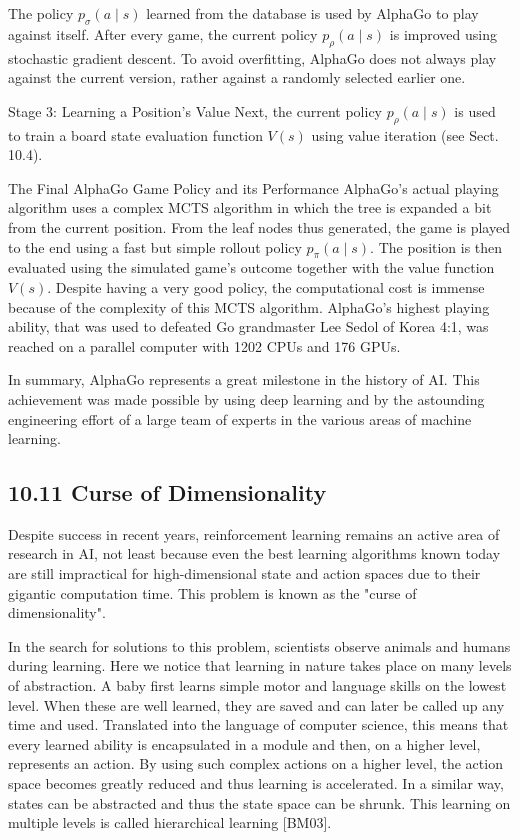 \documentclass[10pt]{article}
\begin{document}
The policy $p_{\sigma}(a \mid s)$ learned from the database is used by AlphaGo to play against itself. After every game, the current policy $p_{\rho}(a \mid s)$ is improved using stochastic gradient descent. To avoid overfitting, AlphaGo does not always play against the current version, rather against a randomly selected earlier one.

Stage 3: Learning a Position's Value Next, the current policy $p_{\rho}(a \mid s)$ is used to train a board state evaluation function $V(s)$ using value iteration (see Sect. 10.4).

The Final AlphaGo Game Policy and its Performance AlphaGo's actual playing algorithm uses a complex MCTS algorithm in which the tree is expanded a bit from the current position. From the leaf nodes thus generated, the game is played to the end using a fast but simple rollout policy $p_{\pi}(a \mid s)$. The position is then evaluated using the simulated game's outcome together with the value function $V(s)$. Despite having a very good policy, the computational cost is immense because of the complexity of this MCTS algorithm. AlphaGo's highest playing ability, that was used to defeated Go grandmaster Lee Sedol of Korea 4:1, was reached on a parallel computer with 1202 CPUs and 176 GPUs.

In summary, AlphaGo represents a great milestone in the history of AI. This achievement was made possible by using deep learning and by the astounding engineering effort of a large team of experts in the various areas of machine learning.

\subsection*{10.11 Curse of Dimensionality}
Despite success in recent years, reinforcement learning remains an active area of research in AI, not least because even the best learning algorithms known today are still impractical for high-dimensional state and action spaces due to their gigantic computation time. This problem is known as the "curse of dimensionality".

In the search for solutions to this problem, scientists observe animals and humans during learning. Here we notice that learning in nature takes place on many levels of abstraction. A baby first learns simple motor and language skills on the lowest level. When these are well learned, they are saved and can later be called up any time and used. Translated into the language of computer science, this means that every learned ability is encapsulated in a module and then, on a higher level, represents an action. By using such complex actions on a higher level, the action space becomes greatly reduced and thus learning is accelerated. In a similar way, states can be abstracted and thus the state space can be shrunk. This learning on multiple levels is called hierarchical learning [BM03].
\end{document}
